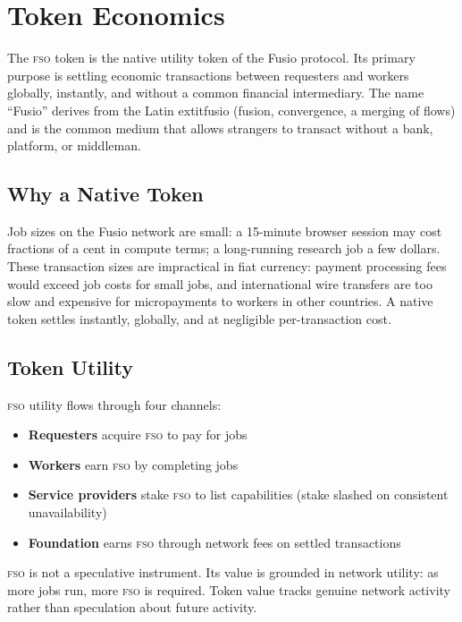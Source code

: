 \documentclass[10pt,twocolumn]{article}
\newcommand{\fso}{\textsc{fso}}
\begin{document}
\section{Token Economics}
\label{sec:token}

The \fso{} token is the native utility token of the Fusio protocol. Its primary purpose is settling economic transactions between requesters and workers globally, instantly, and without a common financial intermediary. The name ``Fusio'' derives from the Latin 	extit{fusio} (fusion, convergence, a merging of flows) and is the common medium that allows strangers to transact without a bank, platform, or middleman.

\subsection{Why a Native Token}

Job sizes on the Fusio network are small: a 15-minute browser session may cost fractions of a cent in compute terms; a long-running research job a few dollars. These transaction sizes are impractical in fiat currency: payment processing fees would exceed job costs for small jobs, and international wire transfers are too slow and expensive for micropayments to workers in other countries. A native token settles instantly, globally, and at negligible per-transaction cost.

\subsection{Token Utility}

\fso{} utility flows through four channels:
\begin{itemize}[noitemsep,leftmargin=*,topsep=2pt]
  \item \textbf{Requesters} acquire \fso{} to pay for jobs
  \item \textbf{Workers} earn \fso{} by completing jobs
  \item \textbf{Service providers} stake \fso{} to list capabilities (stake slashed on consistent unavailability)
  \item \textbf{Foundation} earns \fso{} through network fees on settled transactions
\end{itemize}

\fso{} is not a speculative instrument. Its value is grounded in network utility: as more jobs run, more \fso{} is required. Token value tracks genuine network activity rather than speculation about future activity.
\end{document}
